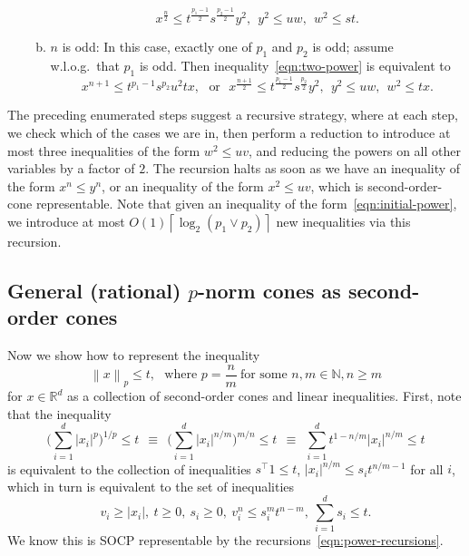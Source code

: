 \documentclass[11pt]{article}
\newcommand{\R}{\mathbb{R}}
\newcommand{\N}{\mathbb{N}}
\newcommand{\ceil}[1]{\left\lceil{#1}\right\rceil}
\newcommand{\norm}[1]{\left\|{#1}\right\|} %
\begin{document}
\begin{enumerate}[(1)]
\begin{enumerate}[a.]
    \begin{equation*}
      x^\frac{n}{2} \le t^\frac{p_1 - 1}{2} s^\frac{p_2 - 1}{2} y^2,
      ~~ y^2 \le u w,
      ~~ w^2 \le st.
    \end{equation*}
  \item $n$ is odd: In this case, exactly one of $p_1$ and $p_2$ is odd;
    assume w.l.o.g.\ that $p_1$ is odd. Then inequality~\eqref{eqn:two-power}
    is equivalent to
    \begin{equation*}
      x^{n + 1} \le t^{p_1 - 1} s^{p_2} u^2 t x,
      ~~~ \mbox{or} ~~~
      x^\frac{n + 1}{2} \le t^\frac{p_1 - 1}{2} s^\frac{p_2}{2}
      y^2,
      ~~ y^2 \le uw, ~~ w^2 \le tx.
    \end{equation*}
  \end{enumerate}
\end{enumerate}

The preceding enumerated steps suggest a recursive strategy, where at each
step, we check which of the cases we are in, then perform a reduction to
introduce at most three inequalities of the form $w^2 \le uv$, and reducing
the powers on all other variables by a factor of $2$. The recursion halts as
soon as we have an inequality of the form $x^n \le y^n$, or an inequality of
the form $x^2 \le uv$, which is second-order-cone representable.
Note that given an inequality of the form~\eqref{eqn:initial-power},
we introduce at most $O(1) \ceil{\log_2( p_1 \vee p_2)}$ new
inequalities via this recursion.

\subsection*{General (rational) $p$-norm cones as second-order cones}

Now we show how to represent the inequality
\begin{equation}
  \label{eqn:p-norm-cone}
  \norm{x}_p \le t,
  ~~~ \mbox{where~} p = \frac{n}{m}
  ~ \mbox{for~some~} n, m \in \N, n \ge m
\end{equation}
for $x \in \R^d$
as a collection of second-order cones and linear inequalities.
First, note that the inequality
\begin{equation*}
  \bigg(\sum_{i=1}^d |x_i|^p \bigg)^{1/p} \le t
  ~~ \equiv ~~
  \bigg(\sum_{i=1}^d |x_i|^{n/m} \bigg)^{m/n} \le t
  ~~ \equiv ~~
  \sum_{i=1}^d t^{1 - n/m} |x_i|^{n/m} \le t
\end{equation*}
is equivalent to the collection of inequalities
$s^\top 1 \le t$, $|x_i|^{n/m} \le s_i t^{n/m - 1}$ for all $i$,
which in turn is equivalent to the set of inequalities
\begin{equation*}
  v_i \ge |x_i|, ~ t \ge 0, ~ s_i \ge 0, ~ v_i^n \le s_i^m t^{n - m},
  ~ \sum_{i=1}^d s_i \le t.
\end{equation*}
We know this is SOCP representable by the
recursions~\eqref{eqn:power-recursions}.



\end{document}
